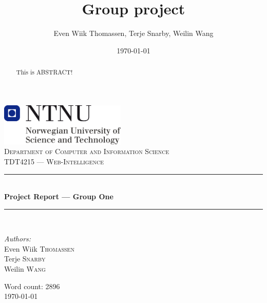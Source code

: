 \documentclass[11pt,a4paper]{report}
\title{Group project}
\author{Even Wiik Thomassen, Terje Snarby, Weilin Wang}
\date{\today}
\begin{document}
\begin{titlepage}
\begin{center}
\includegraphics[width=0.45\textwidth]{./img/NTNU-logo.png}\\[5cm]
\textsc{\large Department of Computer and Information Science}\\[0.2cm]
\textsc{\Large TDT4215 --- Web-Intelligence}\\[0.5cm]

\rule{\linewidth}{0.2mm} \\[0.4cm]
{ \LARGE \bfseries Project Report --- Group One}\\[0.2cm]
\rule{\linewidth}{0.2mm} \\[1.5cm]

\begin{minipage}{0.4\textwidth}
\begin{flushleft} \large
\emph{Authors:}\\
Even Wiik \textsc{Thomassen}\\
Terje \textsc{Snarby}\\
Weilin \textsc{Wang}
\end{flushleft}
\end{minipage}

\vfill
{\large Word count: 2896}\\[0.2cm]
{\large \today}
\end{center}
\end{titlepage}


\begin{abstract}
This is ABSTRACT!
\end{abstract}


\clearpage
{}
{}
\tableofcontents




\setcounter{tocdepth}{1} %
\clearpage
{}
{}
\listoftables
\end{document}

